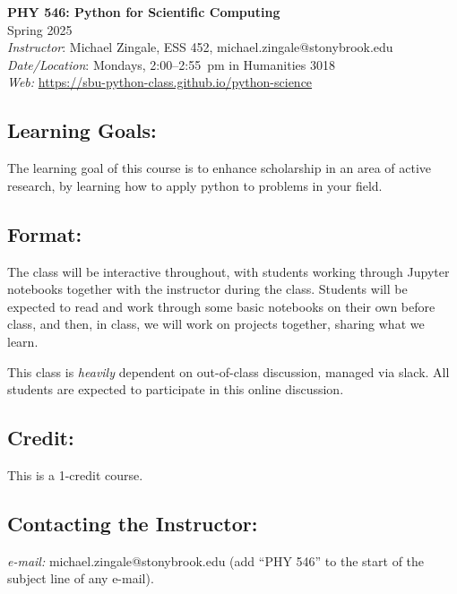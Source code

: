 \documentclass[10pt]{article}
\begin{document}
\begin{center}
{\LARGE \sffamily \bfseries PHY 546: Python for Scientific Computing} \\[1mm]
{\sffamily Spring 2025} \\[3mm]
{\em Instructor}\/: Michael Zingale, ESS 452, michael.zingale@stonybrook.edu \\
{\em Date/Location}\/: Mondays, 2:00--2:55~pm in Humanities 3018 \\
{\em Web:}\/ {\small \url{https://sbu-python-class.github.io/python-science}}
\end{center}

\subsection*{Learning Goals:}

The learning goal of this course is to enhance scholarship in an area
of active research, by learning how to apply python to problems
in your field.


\subsection*{Format:}

The class will be interactive throughout, with students working
through Jupyter notebooks together with the instructor during the
class.  Students will be expected to read and work through some basic
notebooks on their own before class, and then, in class, we will work
on projects together, sharing what we learn.

This class is {\em heavily} dependent on out-of-class discussion,
managed via slack.  All students are expected to participate in this
online discussion.

\subsection*{Credit:}

This is a 1-credit course.


\subsection*{Contacting the Instructor:}

{\em e-mail:} michael.zingale@stonybrook.edu ({add ``PHY 546'' to the
 start of the subject line of any e-mail}).
%
\end{document}
